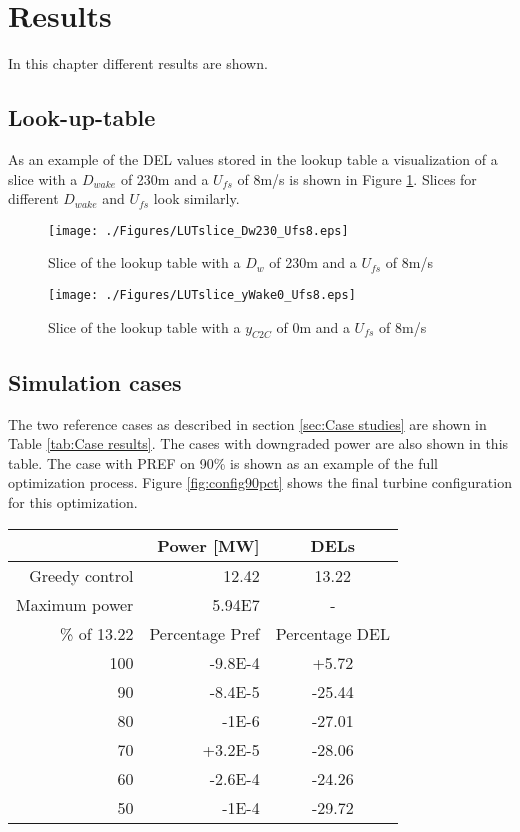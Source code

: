 \section{Results}

In this chapter different results are shown.

\subsection{Look-up-table}
As an example of the DEL values stored in the lookup table a visualization of a slice with a $D_{wake}$ of 230m and a $U_{fs}$ of 8m/s is shown in Figure \ref{fig:LUTsliceC2C}. Slices for different $D_{wake}$ and $U_{fs}$ look similarly.

\begin{figure}
	\texttt{[image: ./Figures/LUTslice\_Dw230\_Ufs8.eps]}
	\caption{Slice of the lookup table with a $D_{w}$ of 230m and a $U_{fs}$ of 8m/s }
	\label{fig:LUTsliceC2C}
\end{figure}

\begin{figure}
	\texttt{[image: ./Figures/LUTslice\_yWake0\_Ufs8.eps]}
	\caption{Slice of the lookup table with a $y_{C2C}$ of 0m and a $U_{fs}$ of 8m/s }
	\label{fig:LUTsliceDw}
\end{figure}

\subsection{Simulation cases}
\label{sec:Simulation cases}
The two reference cases as described in section \ref{sec:Case studies} are shown in Table \ref{tab:Case results}. The cases with downgraded power are also shown in this table. The case with PREF on 90\% is shown as an example of the full optimization process. Figure \ref{fig:config90pct} shows the final turbine configuration for this optimization. 

\begin{table*}[p]
	\caption{Power and DEL values for greedy control and power-only optimization}
	\centering
	\label{tab:Case results}
	\begin{tabular}{rrc}
		\hline
		& Power [MW] & DELs \\ 
		\hline
		Greedy control & 12.42 & 13.22 \\
		Maximum power & 5.94E7 & - \\
		\hline
		\% of 13.22 & Percentage Pref & Percentage DEL\\
		\hline
		100 & -9.8E-4 & +5.72 \\
		90 & -8.4E-5 & -25.44 \\ %
		80 & -1E-6 & -27.01 \\ %
		70 & +3.2E-5 & -28.06 \\ %
		60 & -2.6E-4 & -24.26 \\ %
		50 & -1E-4 & -29.72 \\ %
	\end{tabular}
\end{table*}

